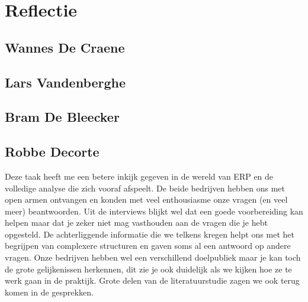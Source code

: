 
\chapter{Reflectie}
\label{ch:reflectie}

\section{Wannes De Craene}


\section{Lars Vandenberghe}


\section{Bram De Bleecker}


\section{Robbe Decorte}

Deze taak heeft me een betere inkijk gegeven in de wereld van ERP en de volledige analyse die zich vooraf afspeelt. De beide bedrijven hebben ons met open armen ontvangen en konden met veel enthousiasme onze vragen (en veel meer) beantwoorden. Uit de interviews blijkt wel dat een goede voorbereiding kan helpen maar dat je zeker niet mag vasthouden aan de vragen die je hebt opgesteld. De achterliggende informatie die we telkens kregen helpt ons met het begrijpen van complexere structuren en gaven soms al een antwoord op andere vragen. Onze bedrijven hebben wel een verschillend doelpubliek maar je kan toch de grote gelijkenissen herkennen, dit zie je ook duidelijk als we kijken hoe ze te werk gaan in de praktijk. Grote delen van de literatuurstudie zagen we ook terug komen in de gesprekken.